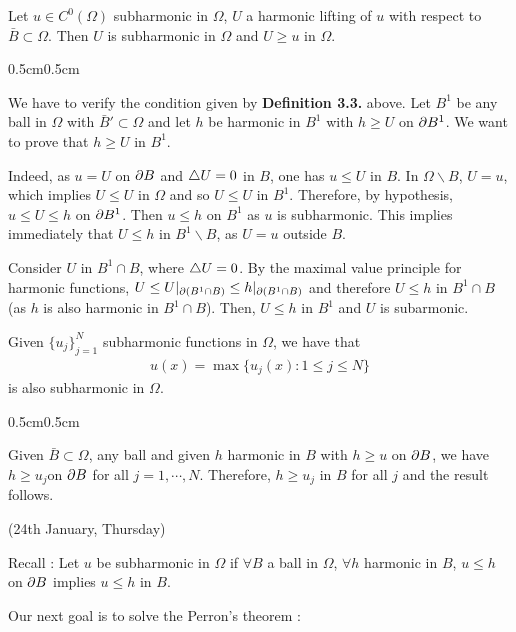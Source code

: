 \documentclass[12pt,a4paper]{article}
\newenvironment{proof}
{\begin{changemargin}{0.5cm}{0.5cm} 
	}%
	{\end{changemargin}
}
\newenvironment{p}
{\begin{proof} 
	}%
	{\end{proof}
}
\begin{document}
 Let $u\in C^0(\Omega)$ subharmonic in $\Omega$, $U$ a harmonic lifting of $u$ with respect to $\bar{B} \subset \Omega$. Then $U$ is subharmonic in $\Omega$ and $U\geq u$ in $\Omega$.
\begin{p}
\pf We have to verify the condition given by \textbf{Definition 3.3.} above. Let $B^1$ be any ball in $\Omega$ with $\bar{B}'\subset \Omega$ and let $h$ be harmonic in $B^1$ with $h\geq U$ on $\partial B^1$. We want to prove that $h\geq U$ in $B^1$.

\quad Indeed, as $u=U$ on $\partial B$ and $\triangle U=0$ in $B$, one has $u\leq U$ in $B$. In $\Omega \backslash B$, $U=u$, which implies $U\leq U$ in $\Omega$ and so $U\leq U$ in $B^1$. Therefore, by hypothesis, $u\leq U \leq h$ on $\partial B^1$. Then $u\leq h$ on $B^1$ as $u$ is subharmonic. This implies immediately that $U\leq h$ in $B^1\backslash B$, as $U=u$ outside $B$.

\quad Consider $U$ in $B^1 \cap B$, where $\triangle U=0$. By the maximal value principle for harmonic functions, $U\leq U|_{\partial (B^1 \cap B)}\leq h|_{\partial (B^1 \cap B)}$ and therefore $U\leq h$ in $B^1\cap B$(as $h$ is also harmonic in $B^1\cap B$). Then, $U\leq h$ in $B^1$ and $U$ is subarmonic.

\eop
\end{p}
\s

 Given $\{u_j\}_{j=1}^N$ subharmonic functions in $\Omega$, we have that 
\begin{align*}
u(x) = \max \{u_j(x) : 1\leq j\leq N\}
\end{align*}
is also subharmonic in $\Omega$.
\begin{proof}
\pf Given $\bar{B} \subset \Omega$, any ball and given $h$ harmonic in $B$ with $h\geq u$ on $\partial B$, we have $h\geq u_j$on $\partial B$ for all $j=1, \cdots, N$. Therefore, $h\geq u_j$ in $B$ for all $j$ and the result follows.

\eop
\end{proof}
\newday

(24th January, Thursday)
\s

Recall : Let $u$ be subharmonic in $\Omega$ if $\forall B$ a ball in $\Omega$, $\forall h$ harmonic in $B$, $u\leq h$ on $\partial B$ implies $u\leq h$ in $B$.
\s

Our next goal is to solve the Perron's theorem :
\s
\end{document}
